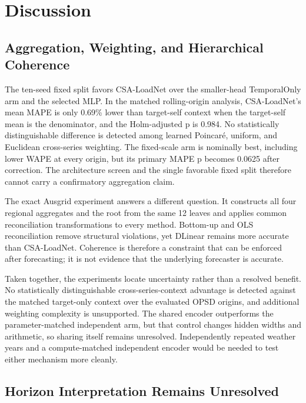 \documentclass[electronics,article,submit,moreauthors]{Definitions/mdpi}
\begin{document}
\section{Discussion}\label{discussion}

\subsection{Aggregation, Weighting, and Hierarchical Coherence}\label{aggregation-weighting-and-hierarchical-coherence}

The ten-seed fixed split favors CSA-LoadNet over the smaller-head TemporalOnly arm and the selected MLP. In the matched rolling-origin analysis, CSA-LoadNet's mean MAPE is only 0.69\% lower than target-self context when the target-self mean is the denominator, and the Holm-adjusted p is 0.984. No statistically distinguishable difference is detected among learned Poincar\'{e}, uniform, and Euclidean cross-series weighting. The fixed-scale arm is nominally best, including lower WAPE at every origin, but its primary MAPE p becomes 0.0625 after correction. The architecture screen and the single favorable fixed split therefore cannot carry a confirmatory aggregation claim.

The exact Ausgrid experiment answers a different question. It constructs all four regional aggregates and the root from the same 12 leaves and applies common reconciliation transformations to every method. Bottom-up and OLS reconciliation remove structural violations, yet DLinear remains more accurate than CSA-LoadNet. Coherence is therefore a constraint that can be enforced after forecasting; it is not evidence that the underlying forecaster is accurate.

Taken together, the experiments locate uncertainty rather than a resolved benefit. No statistically distinguishable cross-series-context advantage is detected against the matched target-only context over the evaluated OPSD origins, and additional weighting complexity is unsupported. The shared encoder outperforms the parameter-matched independent arm, but that control changes hidden widths and arithmetic, so sharing itself remains unresolved. Independently repeated weather years and a compute-matched independent encoder would be needed to test either mechanism more cleanly.

\subsection{Horizon Interpretation Remains Unresolved}\label{horizon-interpretation-remains-unresolved}
\end{document}
